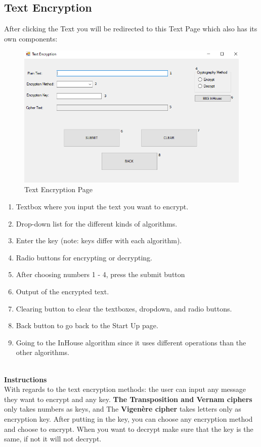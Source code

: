 \subsection{Text Encryption}
After clicking the Text you will be redirected to this Text Page which also has its own components:
\begin{figure}[h!]
\centering
\includegraphics[scale=0.5]{Diagrams/TextEncryption.png}
\caption{Text Encryption Page}
\label{fig:figure1}
\end{figure}


\begin{enumerate}
   \item Textbox where you input the text you want to encrypt.
   \item Drop-down list for the different kinds of algorithms.
   \item Enter the key (note: keys differ with each algorithm).
   \item Radio buttons for encrypting or decrypting.
   \item After choosing numbers 1 - 4, press the submit button
   \item Output of the encrypted text.
   \item Clearing button to clear the textboxes, dropdown, and radio buttons.
   \item Back button to go back to the Start Up page.
   \item Going to the InHouse algorithm since it uses different operations than the other algorithms.
\end{enumerate}

\textbf{\\Instructions\\}
With regards to the text encryption methods: the user can input any message they want to encrypt and any key. \textbf{The Transposition and Vernam ciphers} only takes numbers as keys, and The \textbf{Vigenère cipher} takes letters only as encryption key. After putting in the key, you can choose any encryption method and choose to encrypt. When you want to decrypt make sure that the key is the same, if not it will not decrypt.

